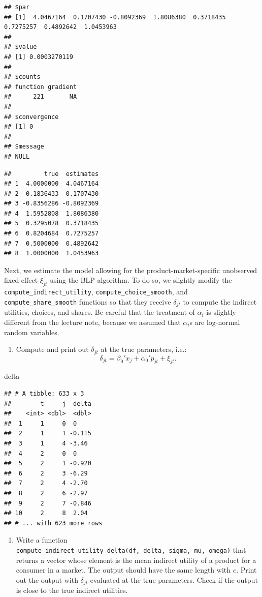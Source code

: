 \documentclass[
]{book}
\newenvironment{Shaded}{\begin{snugshade}}{\end{snugshade}}
\newcommand{\NormalTok}[1]{#1}
\providecommand{\tightlist}{%
  \setlength{\itemsep}{0pt}\setlength{\parskip}{0pt}}
\begin{document}
\begin{verbatim}
## $par
## [1]  4.0467164  0.1707430 -0.8092369  1.8086380  0.3718435  0.7275257  0.4892642  1.0453963
## 
## $value
## [1] 0.0003270119
## 
## $counts
## function gradient 
##      221       NA 
## 
## $convergence
## [1] 0
## 
## $message
## NULL
\end{verbatim}

\begin{verbatim}
##         true  estimates
## 1  4.0000000  4.0467164
## 2  0.1836433  0.1707430
## 3 -0.8356286 -0.8092369
## 4  1.5952808  1.8086380
## 5  0.3295078  0.3718435
## 6  0.8204684  0.7275257
## 7  0.5000000  0.4892642
## 8  1.0000000  1.0453963
\end{verbatim}

Next, we estimate the model allowing for the product-market-specific unobserved fixed effect \(\xi_{jt}\) using the BLP algorithm. To do so, we slightly modify the \texttt{compute\_indirect\_utility}, \texttt{compute\_choice\_smooth}, and \texttt{compute\_share\_smooth} functions so that they receive \(\delta_{jt}\) to compute the indirect utilities, choices, and shares. Be careful that the treatment of \(\alpha_i\) is slightly different from the lecture note, because we assumed that \(\alpha_i\)s are log-normal random variables.

\begin{enumerate}
\def\labelenumi{\arabic{enumi}.}
\setcounter{enumi}{3}
\tightlist
\item
  Compute and print out \(\delta_{jt}\) at the true parameters, i.e.:
  \[
  \delta_{jt} = \beta_0' x_j + \alpha_0' p_{jt} + \xi_{jt}.
  \]
\end{enumerate}

\begin{Shaded}
\begin{Highlighting}[]
\NormalTok{delta}
\end{Highlighting}
\end{Shaded}

\begin{verbatim}
## # A tibble: 633 x 3
##        t     j  delta
##    <int> <dbl>  <dbl>
##  1     1     0  0    
##  2     1     1 -0.115
##  3     1     4 -3.46 
##  4     2     0  0    
##  5     2     1 -0.920
##  6     2     3 -6.29 
##  7     2     4 -2.70 
##  8     2     6 -2.97 
##  9     2     7 -0.846
## 10     2     8  2.04 
## # ... with 623 more rows
\end{verbatim}

\begin{enumerate}
\def\labelenumi{\arabic{enumi}.}
\setcounter{enumi}{4}
\tightlist
\item
  Write a function \texttt{compute\_indirect\_utility\_delta(df,\ delta,\ sigma,\ mu,\ omega)} that returns a vector whose element is the mean indirect utility of a product for a consumer in a market. The output should have the same length with \(e\). Print out the output with \(\delta_{jt}\) evaluated at the true parameters. Check if the output is close to the true indirect utilities.
\end{enumerate}
\end{document}
